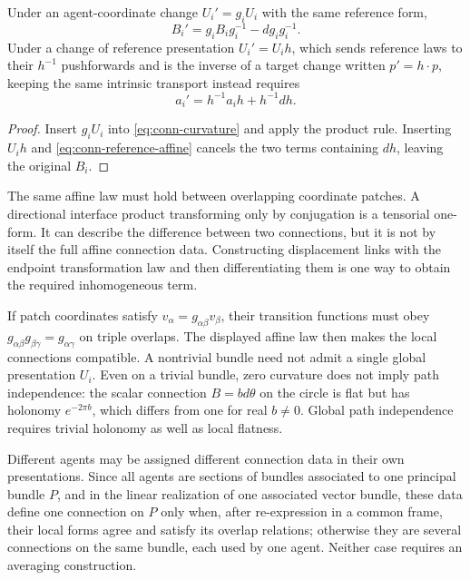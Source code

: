 Under an agent-coordinate change $U_i'=g_iU_i$ with the same reference form,
\begin{equation}
B_i'=g_iB_i g_i^{-1}-dg_i g_i^{-1}.
\end{equation}
Under a change of reference presentation $U_i'=U_i h$, which sends reference laws to their $h^{-1}$ pushforwards and is the inverse of a target change written $p'=h\cdot p$, keeping the same intrinsic transport instead requires
\begin{equation}
a_i'=h^{-1}a_i h+h^{-1}dh.
\label{eq:conn-reference-affine}
\end{equation}
\begin{proof}
Insert $g_iU_i$ into \cref{eq:conn-curvature} and apply the product rule. Inserting $U_i h$ and \cref{eq:conn-reference-affine} cancels the two terms containing $dh$, leaving the original $B_i$.
\end{proof}
The same affine law must hold between overlapping coordinate patches. A directional interface product transforming only by conjugation is a tensorial one-form. It can describe the difference between two connections, but it is not by itself the full affine connection data. Constructing displacement links with the endpoint transformation law and then differentiating them is one way to obtain the required inhomogeneous term.

If patch coordinates satisfy $v_\alpha=g_{\alpha\beta}v_\beta$, their transition functions must obey $g_{\alpha\beta}g_{\beta\gamma}=g_{\alpha\gamma}$ on triple overlaps. The displayed affine law then makes the local connections compatible. A nontrivial bundle need not admit a single global presentation $U_i$. Even on a trivial bundle, zero curvature does not imply path independence: the scalar connection $B=b d\theta$ on the circle is flat but has holonomy $e^{-2\pi b}$, which differs from one for real $b\ne0$. Global path independence requires trivial holonomy as well as local flatness.

Different agents may be assigned different connection data in their own presentations. Since all agents are sections of bundles associated to one principal bundle $P$, and in the linear realization of one associated vector bundle, these data define one connection on $P$ only when, after re-expression in a common frame, their local forms agree and satisfy its overlap relations; otherwise they are several connections on the same bundle, each used by one agent. Neither case requires an averaging construction.

